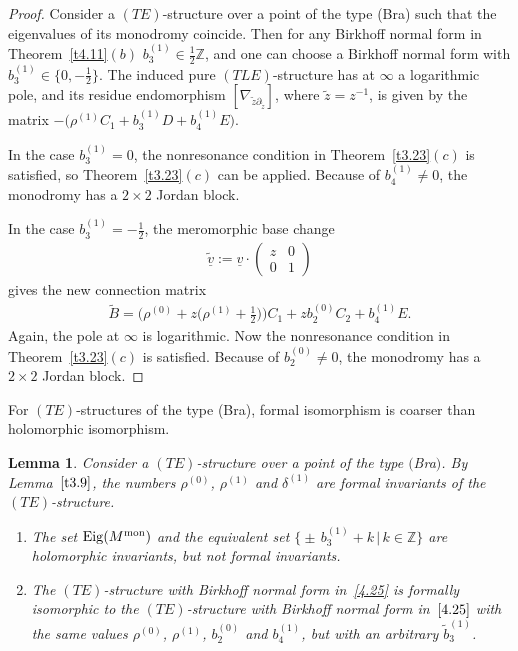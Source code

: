 \documentclass[10pt,a4paper]{amsart}
\numberwithin{equation}{section}
\numberwithin{figure}{section}
\newcommand{\Z}{{\mathbb Z}}
\newcommand{\www}{\widetilde}
\newcommand{\uuuu}{\underline}
\newcommand{\paa}{\partial}
\newcommand{\nnn}{\nabla}
\DeclareMathOperator{\Eig}{Eig}
\newtheorem{Lemma}[Theorem]{Lemma}
\begin{document}
\begin{proof}
Consider a $(TE)$-structure over a point
of the type (Bra) such that the eigenvalues of its monodromy
coincide. Then for any Birkhoff normal form in
Theorem~\ref{t4.11}$(b)$ $b_3^{(1)}\in\frac{1}{2}\Z$,
and one can choose a Birkhoff normal form with
$b_3^{(1)}\in\big\{0,-\frac{1}{2}\big\}$.
The induced pure $(TLE)$-structure
has at $\infty$ a logarithmic pole, and its residue
endomorphism $[\nnn_{\www z\paa_{\www z}}]$, where
$\www z=z^{-1}$, is given by the
matrix $-\big(\rho^{(1)}C_1+b_3^{(1)}D+b_4^{(1)}E\big)$.

In the case $b_3^{(1)}=0$, the nonresonance condition
in Theorem~\ref{t3.23}$(c)$ is satisfied,
so Theorem~\ref{t3.23}$(c)$ can be applied.
Because of $b_4^{(1)}\neq 0$,
the monodromy has a $2\times 2$ Jordan block.

In the case $b_3^{(1)}=-\frac{1}{2}$, the meromorphic
base change
\begin{gather*}
\uuuu{\www v}:=\uuuu{v}\cdot\begin{pmatrix}z&0\\0&1
\end{pmatrix}
\end{gather*}
gives the new connection matrix
\begin{gather*}
\www B=\bigg(\rho^{(0)}+z\bigg(\rho^{(1)}+\frac{1}{2}\bigg)\bigg)C_1+zb_2^{(0)}C_2+b_4^{(1)}E.
\end{gather*}
Again, the pole at $\infty$ is logarithmic.
Now the nonresonance condition in Theorem~\ref{t3.23}$(c)$
is satisfied. Because of $b_2^{(0)}\neq 0$,
the monodromy has a $2\times 2$ Jordan block.
\end{proof}

For $(TE)$-structures of the type (Bra), formal isomorphism
is coarser than holomorphic isomorphism.

\begin{Lemma}\label{t4.14}
Consider a $(TE)$-structure over a point of the type $($Bra$)$.
By Lemma~$\ref{t3.9}$, the numbers $\rho^{(0)}$, $\rho^{(1)}$
and $\delta^{(1)}$ are formal invariants of the
$(TE)$-structure.

\begin{enumerate}\itemsep=0pt
\item[$(a)$] The set $\Eig(M^{\rm mon})$ and the equivalent set
$\big\{{\pm}\, b_3^{(1)}+k\,|\, k\in\Z\big\}$ are holomorphic invariants,
but not formal invariants.

\item[$(b)$]
The $(TE)$-structure with Birkhoff normal form in~\eqref{4.25}
is formally isomorphic to the $(TE)$-structure
with Birkhoff normal form in~$\eqref{4.25}$
with the same values $\rho^{(0)}$, $\rho^{(1)}$, $b_2^{(0)}$ and $b_4^{(1)}$,
but with an arbitrary $\www b_3^{(1)}$.
\end{enumerate}
\end{Lemma}
\end{document}

